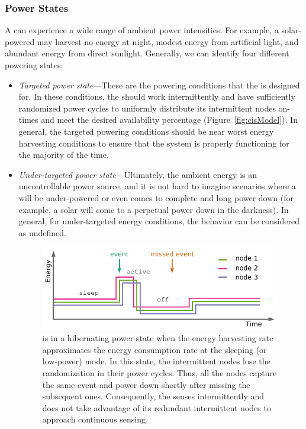 \subsubsection{Power States}
\label{sec:power_state}
A \sys can experience a wide range of ambient power intensities. For example, a solar-powered \sys may harvest no energy at night, modest energy from artificial light, and abundant energy from direct sunlight.  Generally, we can identify four different \sys powering states: 
\begin{itemize}
		\item \textit{Targeted power state}---These are the powering conditions that the \sys is designed for. In these  conditions, the \sys should work intermittently and have sufficiently randomized power cycles to uniformly distribute its intermittent nodes on-times and meet the desired availability percentage (Figure~\ref{fig:cisModel}). In general, the targeted powering conditions should be near worst energy harvesting conditions to ensure that the system is properly functioning for the majority of the time.
		\item \textit{Under-targeted power state}---Ultimately, the ambient energy is an uncontrollable power source, and it is not hard to imagine scenarios where a \sys will be under-powered or even comes to complete and long power down (for example, a solar \sys will come to a perpetual power down in the darkness). In general, for under-targeted energy conditions, the \sys behavior can be considered as undefined.
%
\begin{figure}
		\centering
		\includegraphics[width=\columnwidth]{figures/hibernating_power_state}
		\caption{\fullsys is in a hibernating power state when the energy harvesting rate approximates the energy consumption rate at the sleeping (or low-power) mode. In this state, the intermittent nodes lose the randomization in their power cycles. Thus, all the nodes capture the same event and power down shortly after missing the subsequent ones. Consequently, the \sys senses intermittently and does not take advantage of its redundant intermittent nodes to approach continuous sensing.}

\end{figure}
\end{itemize}
